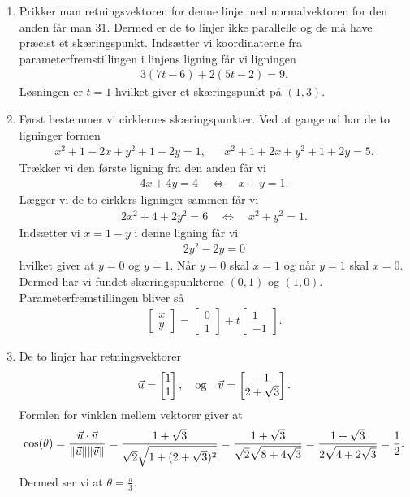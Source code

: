 \begin{enumerate}
	\item Prikker man retningsvektoren for denne linje med normalvektoren for den anden får man $31$. Dermed er de to linjer ikke parallelle og de må have præcist et skæringspunkt. Indsætter vi koordinaterne fra parameterfremstillingen i linjens ligning får vi ligningen
	\begin{align*}
	3(7t-6)+2(5t-2)=9.
	\end{align*}
	Løsningen er $t=1$ hvilket giver et skæringspunkt på $(1,3)$.
	
	\item Først bestemmer vi cirklernes skæringspunkter. Ved at gange ud har de to ligninger formen
	\begin{align*}
	x^2+1-2x+y^2+1-2y=1,&&x^2+1+2x+y^2+1+2y=5.
	\end{align*}
	Trækker vi den første ligning fra den anden får vi
	\begin{align*}
	4x+4y=4\quad \Leftrightarrow\quad x+y=1.
	\end{align*}
	Lægger vi de to cirklers ligninger sammen får vi
	\begin{align*}
	2x^2+4+2y^2=6\quad \Leftrightarrow\quad x^2+y^2=1.
	\end{align*}
	Indsætter vi $x=1-y$ i denne ligning får vi 
	\begin{align*}
	2y^2-2y=0
	\end{align*}
	hvilket giver at $y=0$ og $y=1$. Når $y=0$ skal $x=1$ og når $y=1$ skal $x=0$. Dermed har vi fundet skæringspunkterne $(0,1)$ og $(1,0)$. Parameterfremstillingen bliver så
	\begin{align*}
	\begin{bmatrix}
	x\\y
	\end{bmatrix}=\begin{bmatrix}
	0\\1
	\end{bmatrix}+t \begin{bmatrix}
	1\\-1
	\end{bmatrix}.
	\end{align*}
	

	
	\item\label{it:2dvec14} De to linjer har retningsvektorer 
	\begin{align*}
	\vec{u}=\begin{bmatrix}
	1\\1
	\end{bmatrix},\quad \textup{og} \quad \vec{v}= \begin{bmatrix}
	-1\\2+\sqrt{3}
	\end{bmatrix}.
	\end{align*}
	Formlen for vinklen mellem vektorer giver at
	\begin{align*}
	\cos(\theta)=\frac{\vec{u}\cdot \vec{v}}{\Vert \vec{u}\Vert\Vert \vec{v}\Vert}=\frac{1+\sqrt{3}}{\sqrt{2}\sqrt{1+(2+\sqrt{3})^2}}=\frac{1+\sqrt{3}}{\sqrt{2}\sqrt{8+4\sqrt{3}}}=\frac{1+\sqrt{3}}{2\sqrt{4+2\sqrt{3}}}=\frac{1}{2}.
	\end{align*}
	Dermed ser vi at $\theta=\frac{\pi}{3}$.
	

\end{enumerate}
